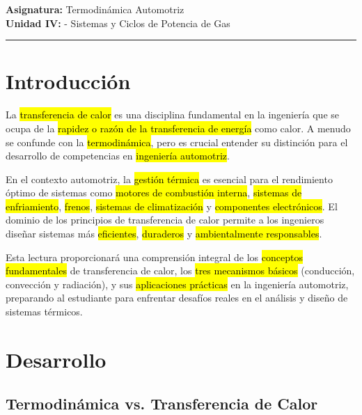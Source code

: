 \documentclass{article}
\begin{document}
	
	\onehalfspacing
	
	
	\textbf{Asignatura:} Termodinámica Automotriz \\
	\textbf{Unidad IV:} - Sistemas y Ciclos de Potencia de Gas
	
	\vspace{5mm}
	\hrule
	\vspace{5mm}

\vspace{1cm}

    \tableofcontents
    \newpage

    \section{Introducción}

    La \hl{transferencia de calor} es una disciplina fundamental en la ingeniería que se ocupa de la \hl{rapidez o razón de la transferencia de energía} como calor. A menudo se confunde con la \hl{termodinámica}, pero es crucial entender su distinción para el desarrollo de competencias en \hl{ingeniería automotriz}.

    En el contexto automotriz, la \hl{gestión térmica} es esencial para el rendimiento óptimo de sistemas como \hl{motores de combustión interna}, \hl{sistemas de enfriamiento}, \hl{frenos}, \hl{sistemas de climatización} y \hl{componentes electrónicos}. El dominio de los principios de transferencia de calor permite a los ingenieros diseñar sistemas más \hl{eficientes}, \hl{duraderos} y \hl{ambientalmente responsables}.

    Esta lectura proporcionará una comprensión integral de los \hl{conceptos fundamentales} de transferencia de calor, los \hl{tres mecanismos básicos} (conducción, convección y radiación), y sus \hl{aplicaciones prácticas} en la ingeniería automotriz, preparando al estudiante para enfrentar desafíos reales en el análisis y diseño de sistemas térmicos.

    \section{Desarrollo}

    \subsection{Termodinámica vs. Transferencia de Calor}
\end{document}
